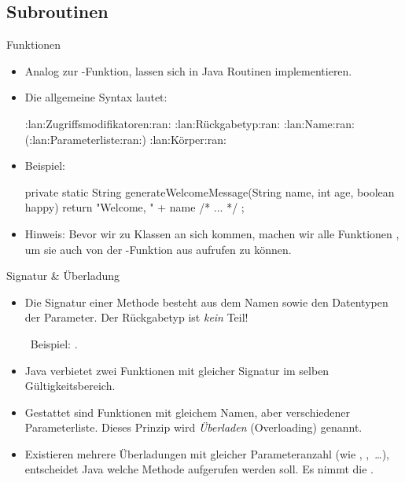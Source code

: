\subsection{Subroutinen}
\begin{frame}[fragile]{Funktionen}
    \begin{itemize}[<+(1)->]
        \item Analog zur -Funktion, lassen sich in Java Routinen implementieren.
        \item Die allgemeine Syntax lautet:\pause{}
{\footnotesize
\begin{plainjava}
:lan:Zugriffsmodifikatoren:ran: :lan:Rückgabetyp:ran: :lan:Name:ran:(:lan:Parameterliste:ran:) {
    :lan:Körper:ran:
}
\end{plainjava}
}
        \item Beispiel: \pause{}
{\footnotesize
\begin{plainjava}
private static String generateWelcomeMessage(String name, int age,
        boolean happy) {
    return "Welcome, " + name /* ... */ ;
}
\end{plainjava}
}
        \item Hinweis:\pause{} Bevor wir zu Klassen an sich kommen,\pause{} machen wir alle Funktionen ,\pause{} um sie auch von der -Funktion aus aufrufen zu können.
    \end{itemize}
\end{frame}

\begin{frame}{Signatur \& Überladung}
    \hypertarget<1>{mrk:Signatur}{}%
    \begin{itemize}[<+(1)->]
        \widei
        \item Die Signatur einer Methode besteht aus dem Namen sowie den Datentypen der Parameter.\pause{} Der Rückgabetyp ist \emph{kein} Teil!\smallskip\par
         \faAngleRight~Beispiel: .
        \item Java verbietet zwei Funktionen mit gleicher Signatur im selben Gültigkeitsbereich.
        \item Gestattet sind Funktionen mit gleichem Namen, aber verschiedener Parameterliste.\pause{} Dieses Prinzip wird \emph{Überladen} (Overloading) genannt.
        \item Existieren mehrere Überladungen mit gleicher Parameteranzahl\pause{} (wie , ,~\ldots),\pause{} entscheidet Java welche Methode aufgerufen werden soll.\pause{} Es nimmt die .
    \end{itemize}
\end{frame}


